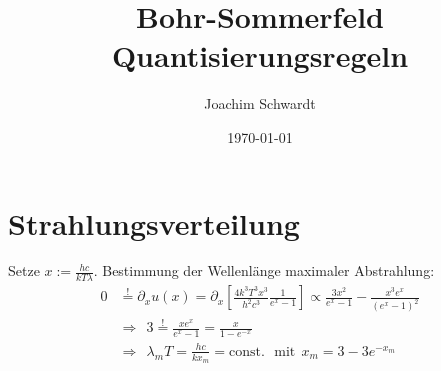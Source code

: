 \documentclass[a4paper,12pt]{article}
\begin{document}
\title{Bohr-Sommerfeld Quantisierungsregeln}
\author{Joachim Schwardt}
\date{\today}
\maketitle

\section{Strahlungsverteilung}
Setze $x:=\frac{hc}{kT\lambda}$. Bestimmung der Wellenlänge maximaler Abstrahlung:
\begin{align*}
0&\overset{!}{=}\partial_x u(x)=\partial_x \left[\frac{4k^3T^3x^3}{h^2c^3}\frac{1}{e^x-1}\right]\propto\frac{3x^2}{e^x-1}-\frac{x^3e^x}{(e^x-1)^2}\\
&\Rightarrow\ \ 3\overset{!}{=}\frac{xe^x}{e^x-1}=\frac{x}{1-e^{-x}}\\
&\Rightarrow\ \ \lambda_mT=\frac{hc}{kx_m}=\mathrm{const.}\ \ \ \mathrm{mit }\ \ x_m=3-3e^{-x_m} 
\end{align*}
\end{document}
